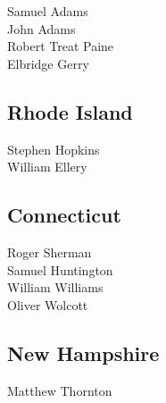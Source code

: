 \documentclass[a4paper,landscape,10pt]{article}
\begin{document}
\begin{multicols}{5}
Samuel Adams\\
John Adams\\
Robert Treat Paine\\
Elbridge Gerry


\subsection*{Rhode Island}

Stephen Hopkins\\
William Ellery



\subsection*{Connecticut}

Roger Sherman\\
Samuel Huntington\\
William Williams\\
Oliver Wolcott

\subsection*{New Hampshire}

Matthew Thornton
\end{multicols}
{}
\end{document}
